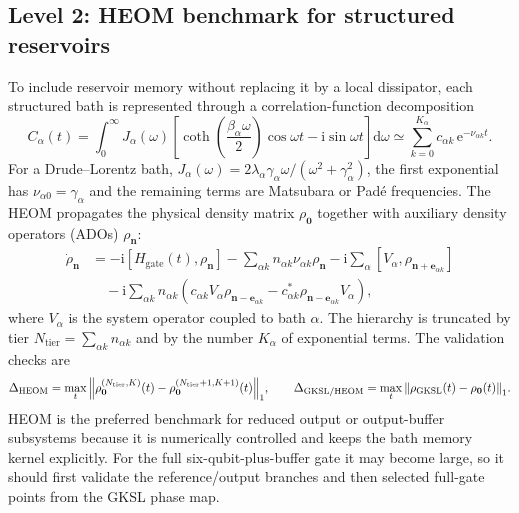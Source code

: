 \documentclass[11pt,a4paper]{article}
\theoremstyle{plain}
\theoremstyle{definition}
\theoremstyle{remark}
\newcommand{\ee}{\mathrm{e}}
\newcommand{\ii}{\mathrm{i}}
\renewcommand{\d}{\mathrm{d}}
\begin{document}
\subsection{Level 2: HEOM benchmark for structured reservoirs}
To include reservoir memory without replacing it by a local dissipator,
each structured bath is represented through a correlation-function
decomposition
\begin{equation}
C_{\alpha}(t)
=\int_0^\infty J_{\alpha}(\omega)
\left[\coth\!\left(\frac{\beta_{\alpha}\omega}{2}\right)\cos\omega t
-\ii\sin\omega t\right]\d\omega
\simeq \sum_{k=0}^{K_\alpha} c_{\alpha k}\,\ee^{-\nu_{\alpha k}t}.
\label{eq:heom-correlation}
\end{equation}
For a Drude--Lorentz bath,
$J_{\alpha}(\omega)=2\lambda_{\alpha}\gamma_{\alpha}
\omega/(\omega^2+\gamma_{\alpha}^2)$, the first exponential has
$\nu_{\alpha0}=\gamma_{\alpha}$ and the remaining terms are Matsubara or
Padé frequencies. The HEOM propagates the physical density matrix
$\rho_{\mathbf{0}}$ together with auxiliary density operators (ADOs)
$\rho_{\mathbf{n}}$:
\begin{align}
\dot\rho_{\mathbf{n}}
&= -\ii[H_{\mathrm{gate}}(t),\rho_{\mathbf{n}}]
-\sum_{\alpha k}n_{\alpha k}\nu_{\alpha k}\rho_{\mathbf{n}}
-\ii\sum_{\alpha}[V_{\alpha},\rho_{\mathbf{n}+\mathbf{e}_{\alpha k}}]
\nonumber\\
&\quad
-\ii\sum_{\alpha k}n_{\alpha k}
\left(c_{\alpha k}V_{\alpha}\rho_{\mathbf{n}-\mathbf{e}_{\alpha k}}
-c_{\alpha k}^{\ast}\rho_{\mathbf{n}-\mathbf{e}_{\alpha k}}V_{\alpha}\right),
\label{eq:heom}
\end{align}
where $V_{\alpha}$ is the system operator coupled to bath $\alpha$. The
hierarchy is truncated by tier
$N_{\mathrm{tier}}=\sum_{\alpha k}n_{\alpha k}$ and by the number
$K_\alpha$ of exponential terms. The validation checks are
\begin{equation}
\Delta_{\mathrm{HEOM}}
=\max_t\norm{\rho_{\mathbf{0}}^{(N_{\mathrm{tier}},K)}(t)
-\rho_{\mathbf{0}}^{(N_{\mathrm{tier}}+1,K+1)}(t)}_1,
\qquad
\Delta_{\mathrm{GKSL/HEOM}}
=\max_t\norm{\rho_{\mathrm{GKSL}}(t)-\rho_{\mathbf{0}}(t)}_1 .
\end{equation}
HEOM is the preferred benchmark for reduced output or output-buffer
subsystems because it is numerically controlled and keeps the bath memory
kernel explicitly. For the full six-qubit-plus-buffer gate it may become
large, so it should first validate the reference/output branches and then
selected full-gate points from the GKSL phase map.
\end{document}
